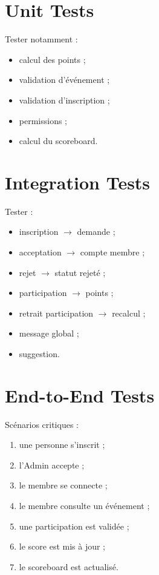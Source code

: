\documentclass[11pt,a4paper]{report}
\begin{document}
\section{Unit Tests}

Tester notamment :

\begin{itemize}
    \item calcul des points ;
    \item validation d'événement ;
    \item validation d'inscription ;
    \item permissions ;
    \item calcul du scoreboard.
\end{itemize}

\section{Integration Tests}

Tester :

\begin{itemize}
    \item inscription $\rightarrow$ demande ;
    \item acceptation $\rightarrow$ compte membre ;
    \item rejet $\rightarrow$ statut rejeté ;
    \item participation $\rightarrow$ points ;
    \item retrait participation $\rightarrow$ recalcul ;
    \item message global ;
    \item suggestion.
\end{itemize}

\section{End-to-End Tests}

Scénarios critiques :

\begin{enumerate}
    \item une personne s'inscrit ;
    \item l'Admin accepte ;
    \item le membre se connecte ;
    \item le membre consulte un événement ;
    \item une participation est validée ;
    \item le score est mis à jour ;
    \item le scoreboard est actualisé.
\end{enumerate}
\end{document}

